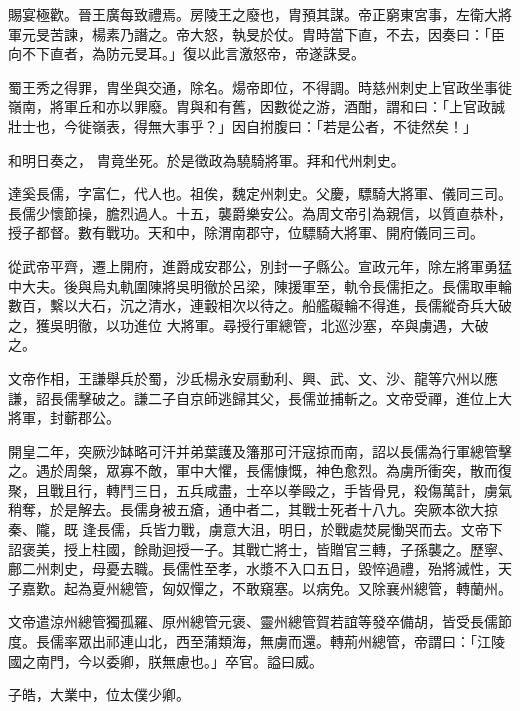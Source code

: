 \begin{pinyinscope}
 賜宴極歡。晉王廣每致禮焉。房陵王之廢也，胄預其謀。帝正窮東宮事，左衛大將軍元旻苦諫，楊素乃譖之。帝大怒，執旻於仗。胄時當下直，不去，因奏曰：「臣向不下直者，為防元旻耳。」復以此言激怒帝，帝遂誅旻。



 蜀王秀之得罪，胄坐與交通，除名。煬帝即位，不得調。時慈州刺史上官政坐事徙嶺南，將軍丘和亦以罪廢。胄與和有舊，因數從之游，酒酣，謂和曰：「上官政誠壯士也，今徙嶺表，得無大事乎？」因自拊腹曰：「若是公者，不徒然矣！」



 和明日奏之，
 胄竟坐死。於是徵政為驍騎將軍。拜和代州刺史。



 達奚長儒，字富仁，代人也。祖俟，魏定州刺史。父慶，驃騎大將軍、儀同三司。長儒少懷節操，膽烈過人。十五，襲爵樂安公。為周文帝引為親信，以質直恭朴，授子都督。數有戰功。天和中，除渭南郡守，位驃騎大將軍、開府儀同三司。



 從武帝平齊，遷上開府，進爵成安郡公，別封一子縣公。宣政元年，除左將軍勇猛中大夫。後與烏丸軌圍陳將吳明徹於呂梁，陳援軍至，軌令長儒拒之。長儒取車輪數百，繫以大石，沉之清水，連轂相次以待之。船艦礙輪不得進，長儒縱奇兵大破之，獲吳明徹，以功進位
 大將軍。尋授行軍總管，北巡沙塞，卒與虜遇，大破之。



 文帝作相，王謙舉兵於蜀，沙氐楊永安扇動利、興、武、文、沙、龍等穴州以應謙，詔長儒擊破之。謙二子自京師逃歸其父，長儒並捕斬之。文帝受禪，進位上大將軍，封蘄郡公。



 開皇二年，突厥沙缽略可汗并弟葉護及籓那可汗寇掠而南，詔以長儒為行軍總管擊之。遇於周槃，眾寡不敵，軍中大懼，長儒慷慨，神色愈烈。為虜所衝突，散而復聚，且戰且行，轉鬥三日，五兵咸盡，士卒以拳毆之，手皆骨見，殺傷萬計，虜氣稍奪，於是解去。長儒身被五瘡，通中者二，其戰士死者十八九。突厥本欲大掠秦、隴，既
 逢長儒，兵皆力戰，虜意大沮，明日，於戰處焚屍慟哭而去。文帝下詔褒美，授上柱國，餘勛迴授一子。其戰亡將士，皆贈官三轉，子孫襲之。歷寧、鄜二州刺史，母憂去職。長儒性至孝，水漿不入口五日，毀悴過禮，殆將滅性，天子嘉歎。起為夏州總管，匈奴憚之，不敢窺塞。以病免。又除襄州總管，轉蘭州。



 文帝遣涼州總管獨孤羅、原州總管元褒、靈州總管賀若誼等發卒備胡，皆受長儒節度。長儒率眾出祁連山北，西至蒲類海，無虜而還。轉荊州總管，帝謂曰：「江陵國之南門，今以委卿，朕無慮也。」卒官。謚曰威。



 子皓，大業中，位太僕少卿。




\end{pinyinscope}

